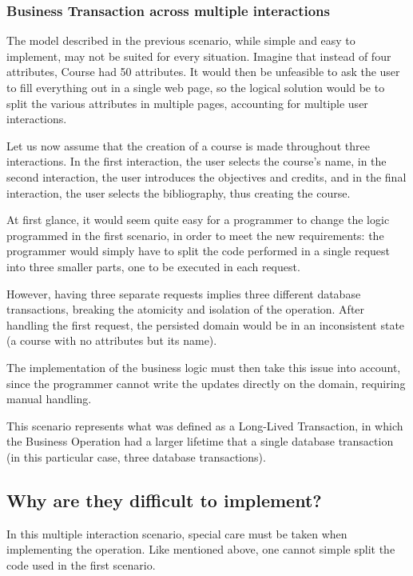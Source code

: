 \documentclass{llncs}
\begin{document}
\subsubsection{Business Transaction across multiple interactions}

The model described in the previous scenario, while simple and easy to
implement, may not be suited for every situation. Imagine that instead
of four attributes, Course had 50 attributes. It would then be
unfeasible to ask the user to fill everything out in a single web
page, so the logical solution would be to split the various attributes
in multiple pages, accounting for multiple user interactions.

Let us now assume that the creation of a course is made throughout
three interactions. In the first interaction, the user selects the
course's name, in the second interaction, the user introduces the
objectives and credits, and in the final interaction, the user selects
the bibliography, thus creating the course.

At first glance, it would seem quite easy for a programmer to change
the logic programmed in the first scenario, in order to meet the new
requirements: the programmer would simply have to split the code
performed in a single request into three smaller parts, one to be
executed in each request.

However, having three separate requests implies three different
database transactions, breaking the atomicity and isolation of the
operation. After handling the first request, the persisted domain
would be in an inconsistent state (a course with no attributes but its
name).

The implementation of the business logic must then take this issue
into account, since the programmer cannot write the updates directly
on the domain, requiring manual handling.

This scenario represents what was defined as a Long-Lived Transaction,
in which the Business Operation had a larger lifetime that a single
database transaction (in this particular case, three database
transactions).

\subsection{Why are they difficult to implement?}
\label{sec:difficult}

In this multiple interaction scenario, special care must be taken when
implementing the operation. Like mentioned above, one cannot simple
split the code used in the first scenario.
\end{document}
